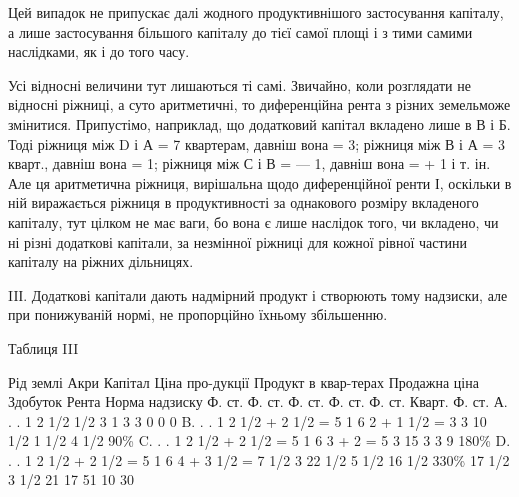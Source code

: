 Цей випадок не припускає далі жодного продуктивнішого застосування
капіталу, а лише застосування більшого капіталу до тієї самої площі і з тими
самими наслідками, як і до того часу.

Усі відносні величини тут лишаються ті самі. Звичайно, коли розглядати
не відносні ріжниці, а суто аритметичні, то диференційна рента з різних земельможе
змінитися. Припустімо, наприклад, що додатковий капітал вкладено лише
в В і Б. Тоді ріжниця між D і А = 7 квартерам, давніш вона = 3; ріжниця
між В і А = 3 кварт., давніш вона = 1; ріжниця між С і В = — 1, давніш
вона = + 1 і т. ін. Але ця аритметична ріжниця, вирішальна щодо диференційної
ренти І, оскільки в ній виражається ріжниця в продуктивності за однакового
розміру вкладеного капіталу, тут цілком не має ваги, бо вона є лише
наслідок того, чи вкладено, чи ні різні додаткові капітали, за незмінної ріжниці
для кожної рівної частини капіталу на ріжних дільницях.

IIІ. Додаткові капітали дають надмірний продукт і створюють тому надзиски,
але при понижуваній нормі, не пропорційно їхньому збільшенню.

Таблиця III

Рід  землі    Акри    Капітал    Ціна про-дукції     Продукт в квар-терах    Продажна  ціна
Здобуток    Рента        Норма надзиску
        Ф. ст. Ф. ст. Ф. ст. Ф. ст. Ф. ст. Кварт. Ф. ст.
А. . .    1                        2 1/2    1/2  3                            1    3             3
  0          0              0
B. . .    1    2 1/2 + 2 1/2 = 5    1     6    2 + 1 1/2 = 3          3      10 1/2     1 1/2    4
1/2    90\%
C. . .    1    2 1/2 + 2 1/2 = 5    1     6    3 + 2 = 5                    3    15    3    3
   9          180\%
D. . .    1    2 1/2 + 2 1/2 = 5    1     6    4 + 3 1/2 = 7 1/2    3    22 1/2    5 1/2    16 1/2
330\%
                                 17 1/2  3 1/2  21                         17                    51
       10           30


